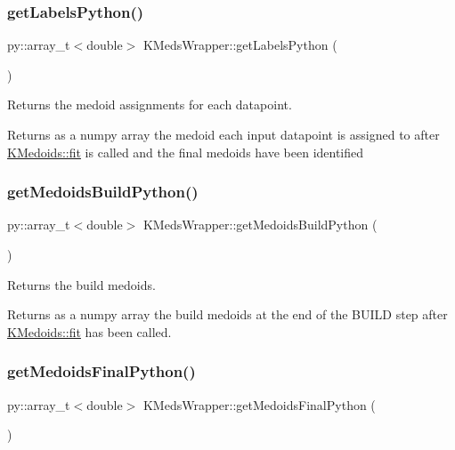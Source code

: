 \subsubsection{\texorpdfstring{get\+Labels\+Python()}{getLabelsPython()}}
{\footnotesize\ttfamily py\+::array\+\_\+t$<$double$>$ K\+Meds\+Wrapper\+::get\+Labels\+Python (\begin{DoxyParamCaption}{ }\end{DoxyParamCaption})\hspace{0.3cm}{\ttfamily [inline]}}



Returns the medoid assignments for each datapoint. 

Returns as a numpy array the medoid each input datapoint is assigned to after \hyperlink{classKMedoids_ae241800e72a6b4a677333ffbf06e1798}{K\+Medoids\+::fit} is called and the final medoids have been identified \mbox{\label{classKMedsWrapper_af272debff6f3b31490d20b8dc7bec322}} 
\subsubsection{\texorpdfstring{get\+Medoids\+Build\+Python()}{getMedoidsBuildPython()}}
{\footnotesize\ttfamily py\+::array\+\_\+t$<$double$>$ K\+Meds\+Wrapper\+::get\+Medoids\+Build\+Python (\begin{DoxyParamCaption}{ }\end{DoxyParamCaption})\hspace{0.3cm}{\ttfamily [inline]}}



Returns the build medoids. 

Returns as a numpy array the build medoids at the end of the B\+U\+I\+LD step after \hyperlink{classKMedoids_ae241800e72a6b4a677333ffbf06e1798}{K\+Medoids\+::fit} has been called. \mbox{\label{classKMedsWrapper_ae825241c43b8bf92912eb59cd12ae1c5}} 
\subsubsection{\texorpdfstring{get\+Medoids\+Final\+Python()}{getMedoidsFinalPython()}}
{\footnotesize\ttfamily py\+::array\+\_\+t$<$double$>$ K\+Meds\+Wrapper\+::get\+Medoids\+Final\+Python (\begin{DoxyParamCaption}{ }\end{DoxyParamCaption})\hspace{0.3cm}{\ttfamily [inline]}}



